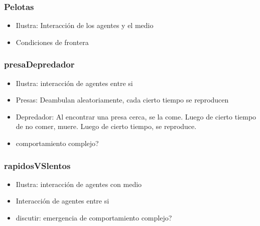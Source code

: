 \documentclass{beamer}
\begin{document}
\begin{frame}[t]
\frametitle{Pelotas}
\begin{itemize}[<+->]
	\item Ilustra: Interacción de los agentes y el medio
	\item Condiciones de frontera
\end{itemize}
\end{frame}

\begin{frame}[t]
\frametitle{presaDepredador}
\begin{itemize}[<+->]
	\item Ilustra: interacción de agentes entre si
	\item Presas: Deambulan aleatoriamente, cada cierto tiempo se reproducen
	\item Depredador: Al encontrar una presa cerca, se la come. Luego de cierto tiempo de no comer, muere. Luego de cierto tiempo, se reproduce.
	\item comportamiento complejo?
\end{itemize}
\end{frame}

\begin{frame}[t]
\frametitle{rapidosVSlentos}
\begin{itemize}[<+->]
	\item Ilustra: interacción de agentes con medio
	\item Interacción de agentes entre si
	\item discutir: emergencia de comportamiento complejo?
\end{itemize}
\end{frame}
\end{document}
